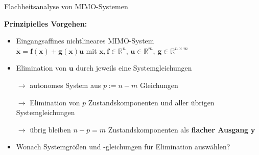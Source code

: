 \documentclass[
	ngerman,
	10pt,				%
	aspectratio=169 	%
]{beamer}
\begin{document}

\begin{frame}[t,fragile,label=Flachheit_2]{\large Flachheitsanalyse von MIMO-Systemen}
	
	\textbf{Prinzipielles Vorgehen:}
	
	\begin{itemize}
		\pause
		\item  Eingangsaffines nichtlineares MIMO-System\\
		$\dot{\mathbf{x}} = \mathbf{f}(\mathbf{x}) + \mathbf{g}(\mathbf{x}) \mathbf{u}$ \quad mit \quad $\mathbf{x}, \mathbf{f} \in \mathbb{R}^n$, $\mathbf{u} \in \mathbb{R}^m$, $\mathbf{g} \in \mathbb{R}^{n \times m}$
		\pause
		\bigskip
		\item Elimination von $\mathbf{u}$ durch jeweils eine Systemgleichungen
		\pause
		\item[$\rightarrow$] autonomes System aus $p := n - m$ Gleichungen
		\pause
		\item[$\rightarrow$] Elimination von $p$ Zustandskomponenten und aller übrigen Systemgleichungen
		\pause
		\item[$\rightarrow$] übrig bleiben $n - p = m $ Zustandskomponenten als \textbf{flacher Ausgang} $\mathbf{y}$
		\pause
		\bigskip
		\item Wonach Systemgrößen und -gleichungen für Elimination auswählen?
	\end{itemize}
	
\end{frame}

\end{document}
